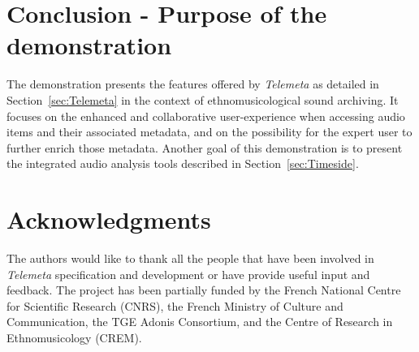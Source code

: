 \documentclass{paper}
\begin{document}
\section{Conclusion - Purpose of the demonstration}\vspace{-0.1cm}
The demonstration presents the features offered by \emph{Telemeta} as detailed in Section~\ref{sec:Telemeta} in the context of ethnomusicological sound archiving.%
It focuses on the enhanced and collaborative user-experience when accessing audio items and their associated metadata, and on the possibility for the expert user to further enrich those metadata.
Another goal of this demonstration is to present the integrated audio analysis tools described in Section~\ref{sec:Timeside}.
\vspace{-0.2cm}
\section*{Acknowledgments} 
{\small The authors would like to thank all the people that have been involved in \emph{Telemeta} specification and development or have provide useful input and feedback. 
The project has been partially funded by the French National Centre for Scientific Research (CNRS), the French Ministry of Culture and Communication, the TGE Adonis Consortium, and the Centre of Research in Ethnomusicology (CREM).}




\end{document}
